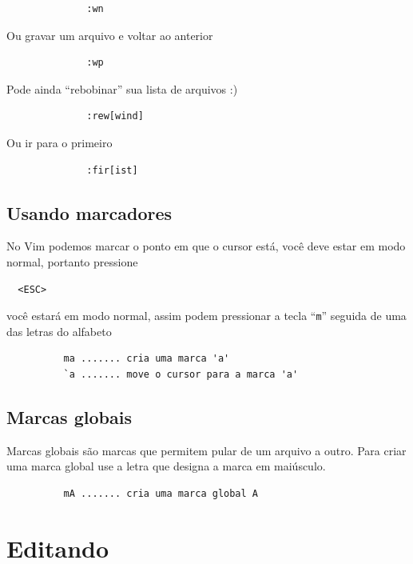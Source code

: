 \documentclass[10pt,a4paper,openany]{book}
\begin{document}
\begin{verbatim}
			  :wn
\end{verbatim}

Ou gravar um arquivo e voltar ao anterior

\begin{verbatim}
			  :wp
\end{verbatim}

Pode ainda ``rebobinar'' sua lista de arquivos :)

\begin{verbatim}
			  :rew[wind]
\end{verbatim}

Ou ir para o primeiro

\begin{verbatim}
			  :fir[ist]
\end{verbatim}

\section{Usando marcadores}
\label{Usando marcadores}

No Vim podemos marcar o ponto em que o cursor está, você deve estar em
modo normal, portanto pressione

\begin{verbatim}
  <ESC>
\end{verbatim}

você estará em modo normal, assim podem pressionar a tecla ``\verb+m+''
seguida de uma das letras do alfabeto

\begin{verbatim}
		  ma ....... cria uma marca 'a'
		  `a ....... move o cursor para a marca 'a'
\end{verbatim}

\section{Marcas globais}
\label{Marcas globais}
Marcas globais são marcas que permitem pular de um arquivo a outro.
Para criar uma marca global use a letra que designa a marca em
maiúsculo.

\begin{verbatim}
		  mA ....... cria uma marca global A
\end{verbatim}

\chapter{Editando}
\label{Editando}
\end{document}
